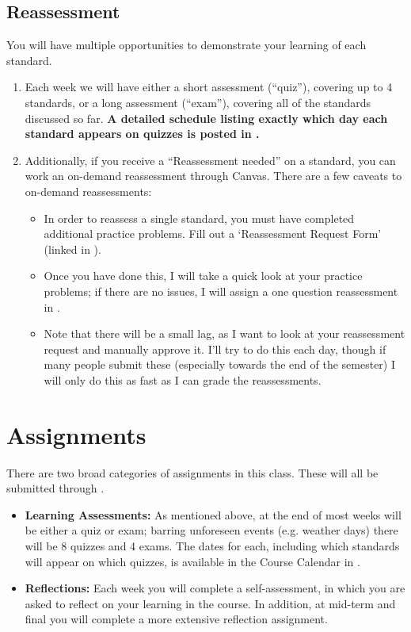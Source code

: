 \documentclass{article}
\begin{document}
    \subsection*{\fontsize{10}{12}\selectfont Reassessment}
    You will have multiple opportunities to demonstrate your learning of each standard.  
    \begin{enumerate}[1)]
    \item Each week we will have either a short assessment (``quiz''), covering  up to 4 standards, or a long assessment (``exam''), covering all of the standards discussed so far.  {\bf A detailed schedule listing exactly which day each standard appears on quizzes is posted in \LMS.}
    \item Additionally, if you receive a ``Reassessment needed'' on a standard, you can work an on-demand reassessment through Canvas.  There are a few caveats to on-demand reassessments:
    \begin{itemize}
    \item In order to reassess a single standard, you must have completed additional practice problems. Fill out a `Reassessment Request Form' (linked in \LMS).
    \item Once you have done this, I will take a quick look at your practice problems; if there are no issues, I will assign a one question reassessment in \LMS.
    \item Note that there will be a small lag, as I want to look at your reassessment request and manually approve it. I'll try to do this each day, though if many people submit these (especially towards the end of the semester) I will only do this as fast as I can grade the reassessments.
\end{itemize}
    \end{enumerate}



\section*{\fontsize{12}{15}\selectfont Assignments}
There are two broad categories of assignments in this class. These will all be submitted through \LMS.
\begin{itemize}
\item \textbf{Learning Assessments: } As mentioned above, at the end of most weeks will be either a quiz or exam; barring unforeseen events (e.g. weather days) there will be 8 quizzes and 4 exams.   The dates for each, including which standards will appear on which quizzes, is available in the Course Calendar in \LMS. 
\item \textbf{Reflections: } Each week you will complete a self-assessment, in which you are asked to reflect on your learning in the course. In addition, at mid-term and final you will complete a more extensive reflection assignment.
\end{itemize}
\end{document}
